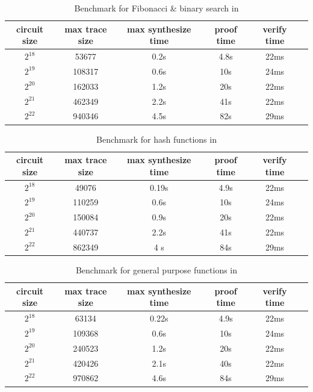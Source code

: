 \begin{table}[!h]
\small
\begin{center}
\caption{Benchmark for Fibonacci \& binary search in \zkwasm}
\label{tbl:fib}
\begin{tabular}{ | c | c | c | c | c| c| }
  \hline
  circuit size & max trace size & max synthesize time & proof time & verify time \\ 
  \hline
  $2^{18}$ & 53677 & 0.2s & 4.8s & 22ms \\
  \hline
  $2^{19}$ & 108317 & 0.6s & 10s & 24ms \\
  \hline
    $2^{20}$ & 162033 & 1.2s & 20s & 22ms \\
  \hline
    $2^{21}$ & 462349 & 2.2s & 41s & 22ms \\
  \hline
    $2^{22}$ & 940346 & 4.5s & 82s & 29ms \\
  \hline
\end{tabular}

\end{center}
\end{table}
\begin{table}[!h]
\small
\begin{center}
\caption{Benchmark for hash functions in \zkwasm}
\label{tbl:hash}
\begin{tabular}{ | c | c | c | c | c| c| }
  \hline
  circuit size & max trace size & max synthesize time & proof time & verify time \\ 
  \hline
  $2^{18}$ & 49076 & 0.19s & 4.9s & 22ms \\
  \hline
  $2^{19}$ & 110259 & 0.6s & 10s & 24ms \\
  \hline
    $2^{20}$ & 150084 & 0.9s & 20s & 22ms \\
  \hline
    $2^{21}$ & 440737 & 2.2s & 41s & 22ms \\
  \hline
    $2^{22}$ & 862349 & 4 s & 84s & 29ms \\
  \hline
\end{tabular}
\end{center}
\end{table}

\begin{table}[!h]
\small
\begin{center}
\caption{Benchmark for general purpose functions in \zkwasm}
\label{tbl:general-purpose}
\begin{tabular}{ | c | c | c | c | c| c| }
  \hline
  circuit size & max trace size & max synthesize time & proof time & verify time \\ 
  \hline
  $2^{18}$ & 63134 & 0.22s & 4.9s & 22ms \\
  \hline
  $2^{19}$ & 109368 & 0.6s & 10s & 24ms \\
  \hline
    $2^{20}$ & 240523 & 1.2s & 20s & 22ms \\
  \hline
    $2^{21}$ & 420426 & 2.1s & 40s & 22ms \\
  \hline
    $2^{22}$ & 970862 & 4.6s & 84s & 29ms \\
  \hline
\end{tabular}
\end{center}
\end{table}

